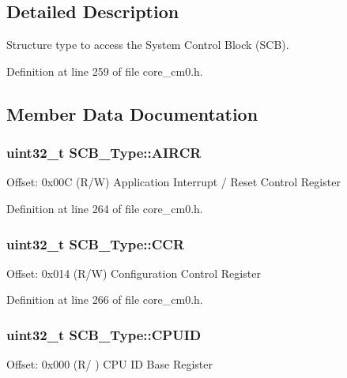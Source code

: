 \subsection{Detailed Description}
Structure type to access the System Control Block (S\+CB). 

Definition at line 259 of file core\+\_\+cm0.\+h.



\subsection{Member Data Documentation}
\subsubsection[{\texorpdfstring{A\+I\+R\+CR}{AIRCR}}]{ uint32\+\_\+t S\+C\+B\+\_\+\+Type\+::\+A\+I\+R\+CR}\hypertarget{struct_s_c_b___type_a6ed3c9064013343ea9fd0a73a734f29d}{}\label{struct_s_c_b___type_a6ed3c9064013343ea9fd0a73a734f29d}
Offset\+: 0x00C (R/W) Application Interrupt / Reset Control Register 

Definition at line 264 of file core\+\_\+cm0.\+h.

\subsubsection[{\texorpdfstring{C\+CR}{CCR}}]{ uint32\+\_\+t S\+C\+B\+\_\+\+Type\+::\+C\+CR}\hypertarget{struct_s_c_b___type_a6d273c6b90bad15c91dfbbad0f6e92d8}{}\label{struct_s_c_b___type_a6d273c6b90bad15c91dfbbad0f6e92d8}
Offset\+: 0x014 (R/W) Configuration Control Register 

Definition at line 266 of file core\+\_\+cm0.\+h.

\subsubsection[{\texorpdfstring{C\+P\+U\+ID}{CPUID}}]{ uint32\+\_\+t S\+C\+B\+\_\+\+Type\+::\+C\+P\+U\+ID}\hypertarget{struct_s_c_b___type_afa7a9ee34dfa1da0b60b4525da285032}{}\label{struct_s_c_b___type_afa7a9ee34dfa1da0b60b4525da285032}
Offset\+: 0x000 (R/ ) C\+PU ID Base Register 

